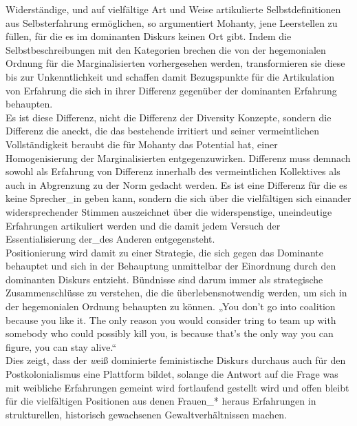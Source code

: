 Widerständige, und auf vielfältige Art und Weise artikulierte
Selbstdefinitionen aus Selbsterfahrung ermöglichen, so argumentiert Mohanty,
jene Leerstellen zu füllen, für die es im dominanten Diskurs keinen Ort gibt.
Indem die Selbstbeschreibungen mit den Kategorien brechen die von der
hegemonialen Ordnung für die Marginalisierten vorhergesehen werden,
transformieren sie diese bis zur Unkenntlichkeit und schaffen damit
Bezugspunkte für die Artikulation von Erfahrung die sich in ihrer Differenz
gegenüber der dominanten Erfahrung behaupten.\footnotemark{}\\

\noindent Es ist diese Differenz, nicht die Differenz der Diversity Konzepte, sondern die
Differenz die aneckt, die das bestehende irritiert und seiner vermeintlichen
Vollständigkeit beraubt die für Mohanty das Potential hat, einer
Homogenisierung der Marginalisierten entgegenzuwirken. Differenz muss demnach
sowohl als Erfahrung von Differenz innerhalb des vermeintlichen Kollektives als
auch in Abgrenzung zu der Norm gedacht werden. Es ist eine Differenz für die es
keine Sprecher\_in geben kann, sondern die sich über die vielfältigen sich
einander widersprechender Stimmen\footnotemark {} auszeichnet über die widerspenstige,
uneindeutige Erfahrungen artikuliert werden und die damit jedem Versuch der
Essentialisierung der\_des Anderen entgegensteht. \\
Positionierung wird damit zu
einer Strategie, die sich gegen das Dominante behauptet und sich in der
Behauptung unmittelbar der Einordnung durch den dominanten Diskurs entzieht.
Bündnisse sind darum immer als strategische Zusammenschlüsse zu verstehen, die
die überlebensnotwendig werden, um sich in der hegemonialen Ordnung behaupten
zu können. „You don't go into coalition because you like it. The only reason
you would consider tring to team up with somebody who could possibly kill you,
is because that's the only way you can figure, you can stay alive.“
\footnotemark {}\\

\noindent Dies zeigt, dass der \textit{w}eiß dominierte feministische Diskurs durchaus auch für
den Postkolonialismus eine Plattform bildet, solange die Antwort auf die Frage
was mit weibliche Erfahrungen gemeint wird fortlaufend gestellt wird und offen
bleibt für die vielfältigen Positionen aus denen Frauen\_* heraus Erfahrungen
in strukturellen, historisch gewachsenen Gewaltverhältnissen machen.

